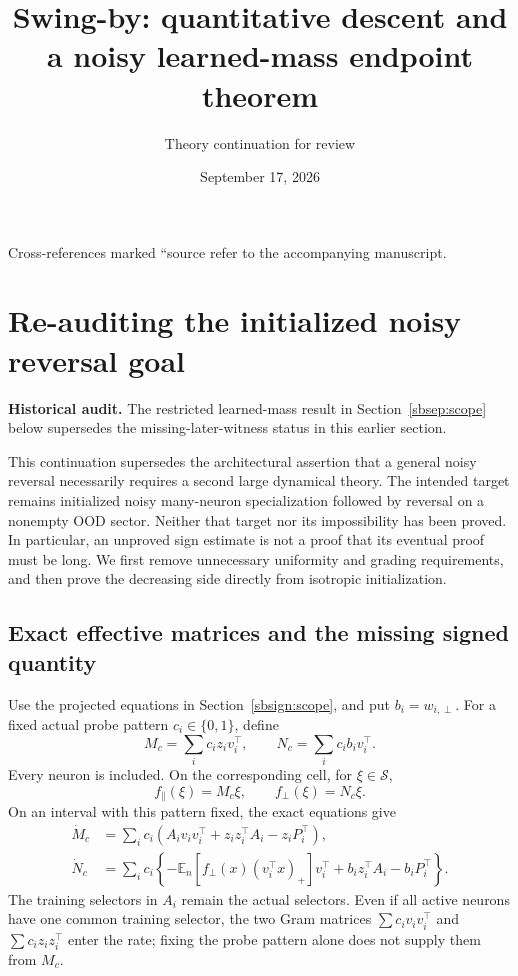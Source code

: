 \documentclass[11pt]{article}
\title{Swing-by: quantitative descent and a noisy learned-mass endpoint theorem}
\author{Theory continuation for review}
\date{September 17, 2026}
\theoremstyle{remark}
\begin{document}
\maketitle
\hypertarget{source-anchor}{Cross-references marked ``source refer to the accompanying manuscript.}
\section{Re-auditing the initialized noisy reversal goal}
\label{sbaudit:scope}
\textbf{Historical audit.} The restricted learned-mass result in Section~\ref{sbsep:scope} below supersedes the missing-later-witness status in this earlier section.

This continuation supersedes the architectural assertion that a general noisy
reversal necessarily requires a second large dynamical theory. The intended
target remains initialized noisy many-neuron specialization followed by
reversal on a nonempty OOD sector. Neither that target nor its impossibility
has been proved. In particular, an unproved sign estimate is not a proof that
its eventual proof must be long. We first remove unnecessary uniformity and
grading requirements, and then prove the decreasing side directly from
isotropic initialization.

\subsection{Exact effective matrices and the missing signed quantity}

Use the projected equations in Section~\ref{sbsign:scope}, and put
$b_i=w_{i,\perp}$. For a fixed actual probe pattern $c_i\in\{0,1\}$,
define
\[
 M_c=\sum_i c_i z_iv_i^\top,\qquad
 N_c=\sum_i c_i b_iv_i^\top.
\]
Every neuron is included. On the corresponding cell, for $\xi\in\mathcal S$,
\begin{equation}\label{sbaudit:cell}
 f_\parallel(\xi)=M_c\xi,\qquad f_\perp(\xi)=N_c\xi.
\end{equation}
On an interval with this pattern fixed, the exact equations give
\begin{align}
 \dot M_c&=\sum_i c_i
 (A_iv_iv_i^\top+z_iz_i^\top A_i-z_iP_i^\top),
 \label{sbaudit:matrix-rate}\\
 \dot N_c&=\sum_i c_i
 \left\{-\mathbb E_n[f_\perp(x)(v_i^\top x)_+]v_i^\top
           +b_iz_i^\top A_i-b_iP_i^\top\right\}.
 \label{sbaudit:ambient-rate}
\end{align}
The training selectors in $A_i$ remain the actual selectors. Even if all
active neurons have one common training selector, the two Gram matrices
$\sum c_i v_iv_i^\top$ and $\sum c_i z_iz_i^\top$ enter the rate; fixing
the probe pattern alone does not supply them from $M_c$.
\end{document}
